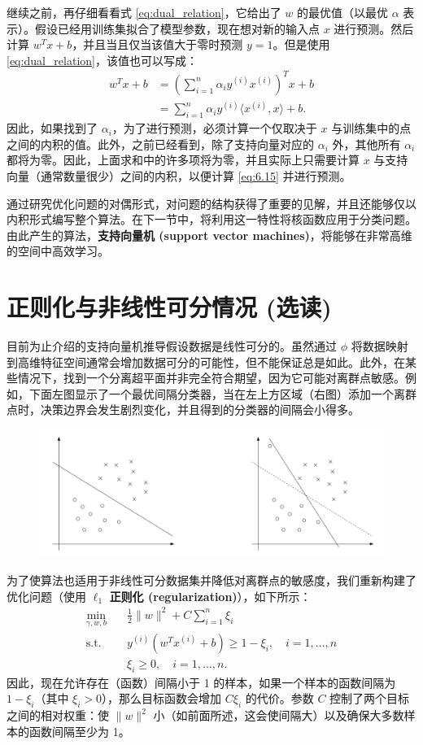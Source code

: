 继续之前，再仔细看看式 \eqref{eq:dual_relation}，它给出了 $w$ 的最优值（以最优 $\alpha$ 表示）。假设已经用训练集拟合了模型参数，现在想对新的输入点 $x$ 进行预测。然后计算 $w^T x + b$，并且当且仅当该值大于零时预测 $y=1$。但是使用 \eqref{eq:dual_relation}，该值也可以写成：
\begin{align}
    w^T x + b &= \left(\sum_{i=1}^n \alpha_i y^{(i)} x^{(i)}\right)^T x + b \\
    &= \sum_{i=1}^n \alpha_i y^{(i)} \langle x^{(i)}, x \rangle + b. \label{eq:6.15}
\end{align}
因此，如果找到了 $\alpha_i$，为了进行预测，必须计算一个仅取决于 $x$ 与训练集中的点之间的内积的值。此外，之前已经看到，除了支持向量对应的 $\alpha_i$ 外，其他所有 $\alpha_i$ 都将为零。因此，上面求和中的许多项将为零，并且实际上只需要计算 $x$ 与支持向量（通常数量很少）之间的内积，以便计算 \eqref{eq:6.15} 并进行预测。

通过研究优化问题的对偶形式，对问题的结构获得了重要的见解，并且还能够仅以内积形式编写整个算法。在下一节中，将利用这一特性将核函数应用于分类问题。由此产生的算法，\textbf{支持向量机 (support vector machines)}，将能够在非常高维的空间中高效学习。

\section{正则化与非线性可分情况 (选读)}

目前为止介绍的支持向量机推导假设数据是线性可分的。虽然通过 $\phi$ 将数据映射到高维特征空间通常会增加数据可分的可能性，但不能保证总是如此。此外，在某些情况下，找到一个分离超平面并非完全符合期望，因为它可能对离群点敏感。例如，下面左图显示了一个最优间隔分类器，当在左上方区域（右图）添加一个离群点时，决策边界会发生剧烈变化，并且得到的分类器的间隔会小得多。

\begin{figure}[H]
    \centering
    \includegraphics[width=0.93\linewidth]{figs/svm_regularization.png}
\end{figure}

为了使算法也适用于非线性可分数据集并降低对离群点的敏感度，我们重新构建了优化问题（使用 $\ell_1$ \textbf{正则化 (regularization)}），如下所示：
\begin{align*}
    \min_{\gamma,w,b} \quad& \frac{1}{2}\|w\|^2 + C \sum_{i=1}^n \xi_i \\
    \text{s.t.} \quad& y^{(i)}(w^T x^{(i)} + b) \ge 1 - \xi_i, \quad i=1,\dots,n \\
    &\xi_i \ge 0, \quad i=1,\dots,n.
\end{align*}
因此，现在允许存在（函数）间隔小于 1 的样本，如果一个样本的函数间隔为 $1-\xi_i$（其中 $\xi_i > 0$），那么目标函数会增加 $C\xi_i$ 的代价。参数 $C$ 控制了两个目标之间的相对权重：使 $\|w\|^2$ 小（如前面所述，这会使间隔大）以及确保大多数样本的函数间隔至少为 1。

